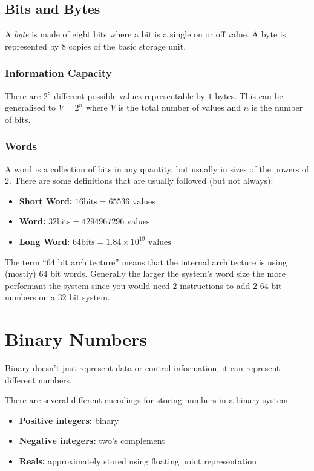 \subsection{Bits and Bytes}\label{sub:bits_and_bytes}

A \emph{byte} is made of eight bits where a bit is a single on or off value.
A byte is represented by \(8\) copies of the basic storage unit.

\subsubsection{Information Capacity}\label{ssub:information_capacity}

There are \(2^8\) different possible values representable by \(1\) bytes.
This can be generalised to \(V=2^{n}\) where \(V\) is the total number of values and \(n\) is the number of bits.

\subsubsection{Words}\label{ssub:words}

A word is a collection of bits in any quantity, but usually in sizes of the powers of \(2\).
There are some definitions that are usually followed (but not always):

\begin{itemize}
	\item \textbf{Short Word:} \(16 \textrm{bits} = 65536 \textrm{ values}\)
	\item \textbf{Word:} \(32 \textrm{bits} = 4294967296 \textrm{ values}\)
	\item \textbf{Long Word:} \(64 \textrm{bits} = 1.84 \times 10^{19} \textrm{ values}\)
\end{itemize}

The term ``\(64\) bit architecture'' means that the internal architecture is using (mostly) \(64\) bit words.
Generally the larger the system's word size the more performant the system since you would need \(2\) instructions to add \(2\) \(64\) bit numbers on a \(32\) bit system.

\section{Binary Numbers}\label{sec:binary_numbers}

Binary doesn't just represent data or control information, it can represent different numbers.

There are several different encodings for storing numbers in a binary system.
\begin{itemize}
	\item \textbf{Positive integers:} binary
	\item \textbf{Negative integers:} two's complement
	\item \textbf{Reals:} approximately stored using floating point representation
\end{itemize}

